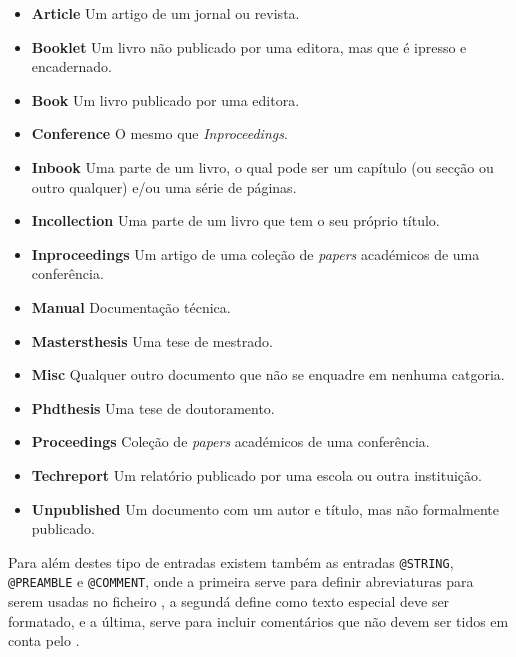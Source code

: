 \begin{itemize}
	\item\textbf{Article      } Um artigo de um jornal ou revista.
    
	\item\textbf{Booklet      } Um livro não publicado por uma editora, mas que
		é ipresso e encadernado.
       
	\item\textbf{Book         } Um livro publicado por uma editora.
       
	\item\textbf{Conference   } O mesmo que \emph{Inproceedings}. 
	\item\textbf{Inbook       } Uma parte de um livro, o qual pode ser um capítulo (ou secção ou outro qualquer) e/ou uma série de páginas.
      
	\item\textbf{Incollection } Uma parte de um livro que tem o seu próprio título.
     
	\item\textbf{Inproceedings} Um artigo de uma coleção de \emph{papers} académicos de uma conferência.
   
	\item\textbf{Manual       } Documentação técnica. 
  
	\item\textbf{Mastersthesis} Uma tese de mestrado.
	\item\textbf{Misc         } Qualquer outro documento que não se enquadre em nenhuma
		catgoria.
       
	\item\textbf{Phdthesis    } Uma tese de doutoramento.
      
	\item\textbf{Proceedings  } Coleção de \emph{papers} académicos de uma conferência.
     
	\item\textbf{Techreport   } Um relatório publicado por uma escola ou outra instituição.
    
	\item\textbf{Unpublished  }  Um documento com um autor e título, mas não formalmente
		publicado.

\end{itemize}

Para além destes tipo de entradas existem também as entradas \texttt{@STRING},
\texttt{@PREAMBLE} e \texttt{@COMMENT}, onde a primeira serve para definir
abreviaturas para serem usadas no ficheiro , a segundá define
como texto especial deve ser formatado, e a última, serve para incluir
comentários que não devem ser tidos em conta pelo .



